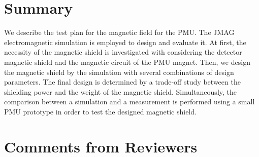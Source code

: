 \documentclass[11pt]{article}
\begin{document}
\section*{Summary}
We describe the test plan for the magnetic field for the PMU.
The JMAG electromagnetic simulation is employed to design and evaluate it.
At first, the necessity of the magnetic shield is investigated with considering the detector magnetic shield and the magnetic circuit of the PMU magnet.
Then, we design the magnetic shield by the simulation with several combinations of design parameters.
The final design is determined by a trade-off study between the shielding power and the weight of the magnetic shield.
Simultaneously, the comparison between a simulation and a measurement is performed using a small PMU prototype in order to test the designed magnetic shield.

\newpage
\section*{Comments from Reviewers}
\end{document}
